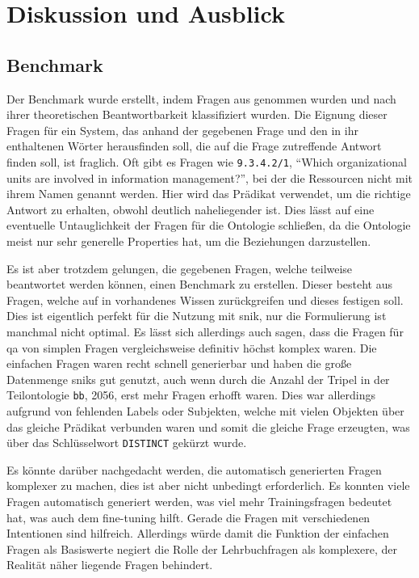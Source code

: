\chapter{Diskussion und Ausblick}\label{ch:discussion}

\section{Benchmark}

Der Benchmark wurde erstellt, indem Fragen aus \citet{bb} genommen wurden und nach ihrer theoretischen Beantwortbarkeit klassifiziert wurden.
Die Eignung dieser Fragen für ein System, das anhand der gegebenen Frage und den in ihr enthaltenen Wörter herausfinden soll, die auf die Frage zutreffende Antwort finden soll, ist fraglich.
Oft gibt es Fragen wie \texttt{9.3.4.2/1}, \enquote{Which organizational units are involved in information management?}, bei der die Ressourcen nicht mit ihrem Namen genannt werden.
Hier wird das Prädikat  verwendet, um die richtige Antwort zu erhalten, obwohl  deutlich naheliegender ist.
Dies lässt auf eine eventuelle Untauglichkeit der Fragen für die Ontologie schließen, da die Ontologie meist nur sehr generelle Properties hat, um die Beziehungen darzustellen.

Es ist aber trotzdem gelungen, die gegebenen Fragen, welche teilweise beantwortet werden können, einen Benchmark zu erstellen.
Dieser besteht aus Fragen, welche auf in \citet{bb} vorhandenes Wissen zurückgreifen und dieses festigen soll.
Dies ist eigentlich perfekt für die Nutzung mit \ac{snik}, nur die Formulierung ist manchmal nicht optimal.
Es lässt sich allerdings auch sagen, dass die Fragen für \acl{qa} von simplen Fragen vergleichsweise definitiv höchst komplex waren.
Die einfachen Fragen waren recht schnell generierbar und haben die große Datenmenge \ac{snik}s gut genutzt,
auch wenn durch die Anzahl der Tripel in der Teilontologie \texttt{bb}, 2056, erst mehr Fragen erhofft waren.
Dies war allerdings aufgrund von fehlenden Labels oder Subjekten, welche mit vielen Objekten über das gleiche Prädikat verbunden waren und somit die gleiche Frage erzeugten,
was über das Schlüsselwort \texttt{DISTINCT} gekürzt wurde.

Es könnte darüber nachgedacht werden, die automatisch generierten Fragen komplexer zu machen, dies ist aber nicht unbedingt erforderlich.
Es konnten viele Fragen automatisch generiert werden, was viel mehr Trainingsfragen bedeutet hat, was auch dem fine-tuning hilft.
Gerade die Fragen mit verschiedenen Intentionen sind hilfreich.
Allerdings würde damit die Funktion der einfachen Fragen als Basiswerte negiert die Rolle der Lehrbuchfragen als komplexere, der Realität näher liegende Fragen behindert. 

